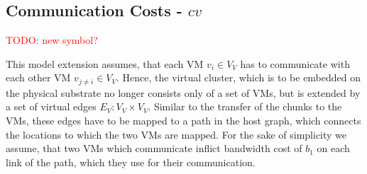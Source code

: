 \documentclass[9pt,twocolumn]{scrartcl}
\newcommand{\VM}{\textsc{VM}}
\newcommand{\Chunk}{\ensuremath{c}}
\newcommand{\Problem}{\textsc{DummyName Problem}}
\newcommand{\carlo}[1]{\textcolor{red}{#1}}
\newcommand{\VirtualNodes}{\ensuremath{V_V}}
\newcommand{\VirtualEdges}{\ensuremath{E_V}}
\newcommand{\VirtualNode}{\ensuremath{v}}
\newcommand{\CostCom}{\ensuremath{b_1}}
\begin{document}
%
%
%
%
%

\subsection{Communication Costs - $cv$}

\carlo{TODO: new symbol?}

This model extension assumes, that each VM  $\VirtualNode_i \in \VirtualNodes$
has to communicate with each other VM $\VirtualNode_{j \neq i} \in
\VirtualNodes$. Hence, the virtual cluster, which is to be embedded on the
physical substrate no longer consists only of a set of VMs, but is extended by a
set of virtual edges $\VirtualEdges : \VirtualNodes \times \VirtualNodes$.
Similar to the transfer of the chunks to the VMs, these edges have to be mapped
to a path in the host graph, which connects the locations to which the two VMs
are mapped. For the sake of simplicity we assume, that two VMs which communicate
inflict bandwidth cost of $\CostCom$ on each link of the path, which they use
for their communication.
\end{document}
